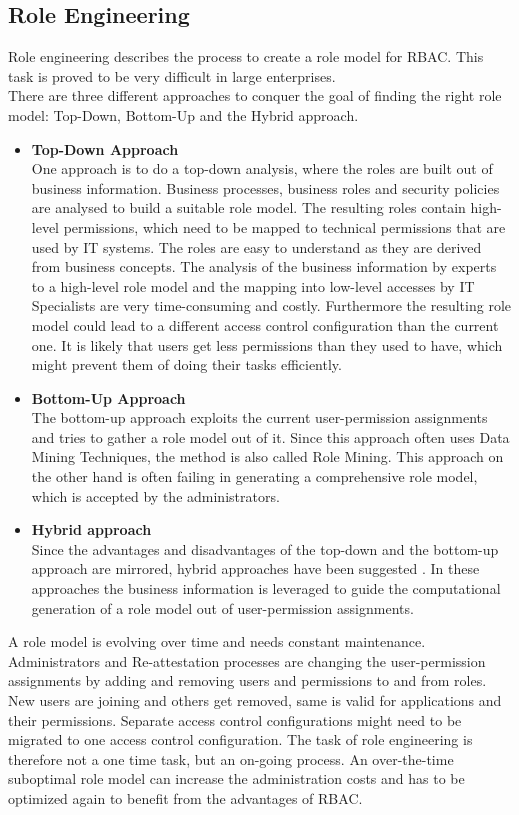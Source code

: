     \subsection{Role Engineering}
    Role engineering \cite{coyne2011role} describes the process to create a role model for RBAC. This task is proved to be very difficult in large enterprises.\\
    There are three different approaches to conquer the goal of finding the right role model: Top-Down, Bottom-Up and the Hybrid approach\cite{coyne2011role}\cite{Frank}.
    \begin{itemize}
        \item \textbf{Top-Down Approach}\\
        One approach is to do a top-down analysis, where the roles are built out of business information. Business processes, business roles and security policies are analysed to build a suitable role model. The resulting roles contain high-level permissions, which need to be mapped to technical permissions that are used by IT systems. The roles are easy to understand as they are derived from business concepts. The analysis of the business information by experts to a high-level role model and the mapping into low-level accesses by IT Specialists are very time-consuming and costly. Furthermore the resulting role model could lead to a different access control configuration than the current one. It is likely that users get less permissions than they used to have, which might prevent them of doing their tasks efficiently.
        \item \textbf{Bottom-Up Approach}\\
        The bottom-up approach exploits the current user-permission assignments and tries to gather a role model out of it. Since this approach often uses Data Mining Techniques, the method is also called Role Mining\cite{Kuhlmann}. This approach on the other hand is often failing in generating a comprehensive role model, which is accepted by the administrators\cite{Frank2013}.
        \item \textbf{Hybrid approach}\\
        Since the advantages and disadvantages of the top-down and the bottom-up approach are mirrored, hybrid approaches have been suggested \cite{Frank}\cite{6274146}. In these approaches the business information is leveraged to guide the computational generation of a role model out of user-permission assignments.
    \end{itemize}
    A role model is evolving over time and needs constant maintenance\cite{Montrieux:2011}. Administrators and Re-attestation processes are changing the user-permission assignments by adding and removing users and permissions to and from roles. New users are joining and others get removed, same is valid for applications and their permissions. Separate access control configurations might need to be migrated to one access control configuration. The task of role engineering is therefore not a one time task, but an on-going process. An over-the-time suboptimal role model can increase the administration costs and has to be optimized again to benefit from the advantages of RBAC.
    
